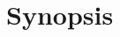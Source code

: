 \documentclass[11pt,a4paper,final]{article}
\begin{document}
 %

\setcounter{footnote}{0}
\section{Synopsis}

\end{document}
